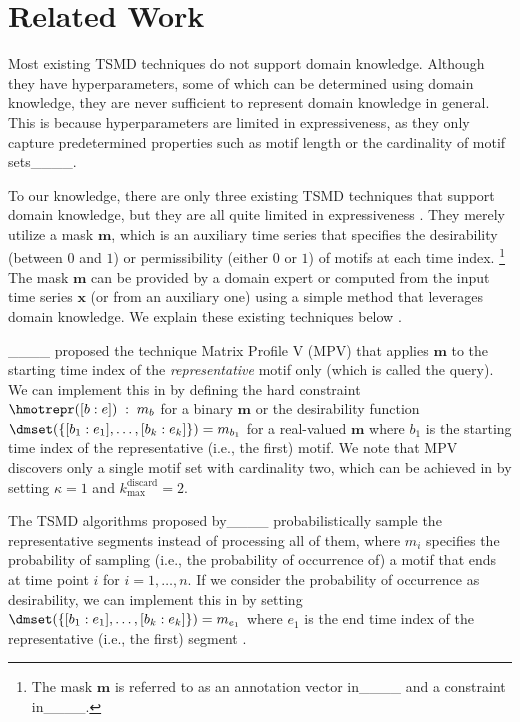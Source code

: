 \section{Related Work}
\label{sec:related_work}

%
%
%
%
%
%
%
%
%
%
Most existing TSMD techniques do not support domain knowledge. 
Although they have hyperparameters, some of which can be determined using domain knowledge, they are never sufficient to represent domain knowledge in general. 
This is because hyperparameters are limited in expressiveness, as they only capture predetermined properties such as motif length or the cardinality of motif sets____. %
%
%
%
%
%
%


%
%
%
%

%
%
%

%
%


%
%
%

To our knowledge, there are only three existing TSMD techniques that support domain knowledge, but they are all quite limited in expressiveness%
. 
They merely utilize a mask $\mathbf{m}$, which is an auxiliary time series that specifies the desirability (between $0$ and $1$) or permissibility (either $0$ or $1$) of motifs at each time index.%
\footnote{The mask $\mathbf{m}$ is referred to as an annotation vector in____ and a constraint in____.} 
The mask $\mathbf{m}$ can be provided by a domain expert or computed from the input time series $\mathbf{x}$ (or from an auxiliary one) using a simple method that leverages domain knowledge. 
We explain these existing techniques below%
.

%
%
%
____ proposed the technique Matrix Profile V (MPV) that applies $\textbf{m}$ to the starting time index of the \textit{representative} motif only (which is called the query). 
We can implement this in \locomotifdok by defining 
the hard constraint $\hmotrepr([b:e]) \;:\; m_b$ %
for a binary $\mathbf{m}$ 
or
the desirability function $\dmset(\{ [b_1 : e_1], \ldots, [b_k : e_k] \}) = m_{b_1}$ for a real-valued $\mathbf{m}$ 
where $b_1$ is the starting time index of the representative (i.e., the first) motif. 
We note that
%
MPV discovers only a single motif set with cardinality two, which can be achieved in \locomotifdok by setting $\kappa=1$ and $k_\mathrm{max}^\text{discard}=2$.

%
%
%
%
%
%
%

%
%
The TSMD algorithms proposed by____ probabilistically sample the representative segments %
instead of processing all of them, where
%
$m_i$ specifies the probability of sampling (i.e., the probability of occurrence of) a motif that ends at time point $i$ 
for $i=1,\ldots,n$. 
If we consider the probability of occurrence as desirability, we can implement this in \locomotifdok by setting 
%
$\dmset(\{ [b_1 : e_1], \ldots, [b_k : e_k] \}) = m_{e_1}$ 
where $e_1$ is the end time index of the representative (i.e., the first) segment%
.
%
%
%
%
%
%


